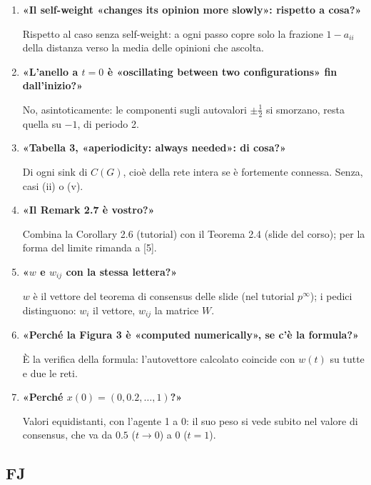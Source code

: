 \documentclass[a4paper,10pt]{article}
\newcommand{\D}[2]{\item \textbf{«#1»}\par #2}
\newcommand{\priorita}[1]{\par\smallskip{\color{unipd}\itshape #1}\par}
\begin{document}
\priorita{Priorità bassa}
\begin{enumerate}[resume*=fdg]
  \D{Il self-weight «changes its opinion more slowly»: rispetto a cosa?}{Rispetto al caso senza self-weight: a ogni passo copre solo la frazione $1-a_{ii}$ della distanza verso la media delle opinioni che ascolta.}
  \D{L'anello a $t=0$ è «oscillating between two configurations» fin dall'inizio?}{No, asintoticamente: le componenti sugli autovalori $\pm\frac12$ si smorzano, resta quella su $-1$, di periodo 2.}
  \D{Tabella 3, «aperiodicity: always needed»: di cosa?}{Di ogni sink di $C(G)$, cioè della rete intera se è fortemente connessa. Senza, casi (ii) o (v).}
  \D{Il Remark 2.7 è vostro?}{Combina la Corollary 2.6 (tutorial) con il Teorema 2.4 (slide del corso); per la forma del limite rimanda a [5].}
  \D{$w$ e $w_{ij}$ con la stessa lettera?}{$w$ è il vettore del teorema di consensus delle slide (nel tutorial $p^\infty$); i pedici distinguono: $w_i$ il vettore, $w_{ij}$ la matrice $W$.}
  \D{Perché la Figura 3 è «computed numerically», se c'è la formula?}{È la verifica della formula: l'autovettore calcolato coincide con $w(t)$ su tutte e due le reti.}
  \D{Perché $x(0)=(0,0.2,\dots,1)$?}{Valori equidistanti, con l'agente 1 a 0: il suo peso si vede subito nel valore di consensus, che va da $0.5$ ($t\to0$) a $0$ ($t=1$).}
\end{enumerate}

\clearpage
\subsection*{FJ}
\end{document}
